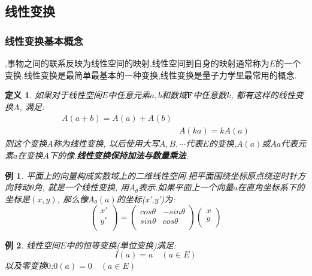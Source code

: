 \documentclass[a4paper,11pt]{article}
\newtheorem{definition}{\hspace{2em}定义}[section]
\newtheorem{example}{例}[section]
\begin{document}
\subsection{线性变换}
\subsubsection*{线性变换基本概念}
,事物之间的联系反映为线性空间的映射,线性空间到自身的映射通常称为$E$的一个变换.线性变换是最简单最基本的一种变换,线性变换是量子力学里最常用的概念.
\begin{definition}
  如果对于线性空间$E$中任意元素$a,b$和数域$\mathbf{F}$中任意数$k$, 都有这样的线性变换$A$, 满足:
  \begin{equation*}
  \begin{split}
     A(a+b)=A(a)+A(b)\\
     &A(ka)=kA(a)
  \end{split}
  \end{equation*}
  则这个变换$A$称为线性变换, 以后使用大写$A,B,\cdots$代表$E$的变换,$A(a)$或$Aa$代表元素$a$在变换$A$下的像.\textbf{线性变换保持加法与数量乘法}.
\end{definition}
\begin{example}
  平面上的向量构成实数域上的二维线性空间.把平面围绕坐标原点绕逆时针方向转动$\theta$角, 就是一个线性变换, 用$A_\theta$表示.如果平面上一个向量$a$在直角坐标系下的坐标是$(x,y)$, 那么像$A_\theta(a)$的坐标(x',y')为:
  \begin{equation*}
    \begin{pmatrix}
      x' \\
      y' \\
    \end{pmatrix}=\begin{pmatrix}
                    cos\theta & -sin\theta \\
                    sin\theta & cos\theta \\
                  \end{pmatrix}\begin{pmatrix}
                                 x \\
                                 y \\
                               \end{pmatrix}
  \end{equation*}
\end{example}
\begin{example}
  线性空间$E$中的恒等变换(单位变换)满足:
  \begin{equation*}
    I(a)=a\quad(a\in E)
  \end{equation*}
  以及零变换$0$:$0(a)=0\quad (a\in E)$
\end{example}
\end{document}
